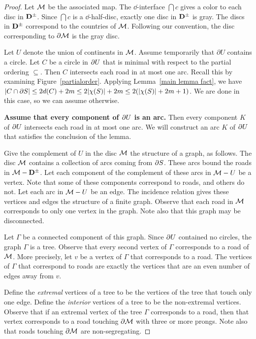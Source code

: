 \begin{proof}
Let $\mathcal{M}$ be the associated map.  The $\dd$-interface $\dint{c}$ gives a color to each disc in $\mathbf{D}^\pm$.  Since $\dint{c}$ is a $\dd$-half-disc, exactly one disc in $\mathbf{D}^\pm$ is gray.  The discs in $\mathbf{D}^\pm$ correspond to the countries of $\mathcal{M}$.  Following our convention, the disc corresponding to $\partial \mathcal{M}$ is the gray disc.

Let $U$ denote the union of continents in $\mathcal{M}$.  Assume temporarily that $\partial U$ contains a circle.  Let $C$ be a circle in $\partial U$ that is minimal with respect to the partial ordering $\subseteq$.  Then $C$ intersects each road in at most one arc.  Recall this by examining Figure~\ref{partialorder}.  Applying Lemma~\ref{main lemma fact}, we have $|C\cap\partial S|\leq 2d(C)+2m\leq 2| \chi (S) |+2m\leq 2(| \chi (S) |+2m+1)$.  We are done in this case, so we can assume otherwise.

\textbf{Assume that every component of $\partial U$ is an arc.}  Then every component $K$ of $\partial U$ intersects each road in at most one arc.  We will construct an arc $K$ of $\partial U$ that satisfies the conclusion of the lemma.  

Give the complement of $U$ in the disc $\mathcal{M}$ the structure of a graph, as follows.  The disc $\mathcal{M}$ contains a collection of arcs coming from $\partial S$.  These arcs bound the roads in $\mathcal{M}-\mathbf{D}^\pm$.  Let each component of the complement of these arcs in $\mathcal{M}-U$ be a vertex.  Note that some of these components correspond to roads, and others do not.  Let each arc in $\mathcal{M}-U$ be an edge.  The incidence relation gives these vertices and edges the structure of a finite graph.  Observe that each road in $\mathcal{M}$ corresponds to only one vertex in the graph.  Note also that this graph may be disconnected.

Let $\Gamma$ be a connected component of this graph.  Since $\partial U$ contained no circles, the graph $\Gamma$ is a tree.  Observe that every second vertex of $\Gamma$ corresponds to a road of $\mathcal{M}$.  More precisely, let $v$ be a vertex of $\Gamma$ that corresponds to a road.  The vertices of $\Gamma$ that correspond to roads are exactly the vertices that are an even number of edges away from $v$.


Define the \emph{extremal} vertices of a tree to be the vertices of the tree that touch only one edge.  Define the \emph{interior} vertices of a tree to be the non-extremal vertices.  Observe that if an extremal vertex of the tree $\Gamma$ corresponds to a road, then that vertex corresponds to a road touching $\partial\mathcal{M}$ with three or more prongs.  Note also that roads touching $\partial\mathcal{M}$ are non-segregating. 


\end{proof}
